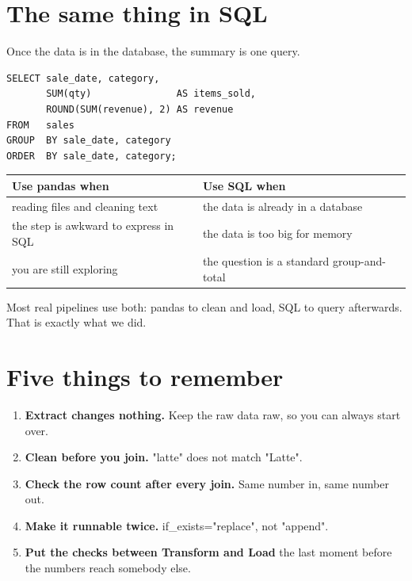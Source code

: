 \documentclass[11pt,letterpaper]{article}
\newcommand{\py}[1]{{\ttfamily\small#1}}
\begin{document}
\section{The same thing in SQL}

Once the data is in the database, the summary is one query.

\begin{lstlisting}[style=sql]
SELECT sale_date, category,
       SUM(qty)               AS items_sold,
       ROUND(SUM(revenue), 2) AS revenue
FROM   sales
GROUP  BY sale_date, category
ORDER  BY sale_date, category;
\end{lstlisting}

{\sffamily\footnotesize
\begin{tabular}{@{}p{6.4cm}p{6.4cm}@{}}
\toprule
\textbf{Use pandas when} & \textbf{Use SQL when} \\
\midrule
reading files and cleaning text       & the data is already in a database \\
the step is awkward to express in SQL & the data is too big for memory \\
you are still exploring               & the question is a standard group-and-total \\
\bottomrule
\end{tabular}}

\vspace{4pt}
Most real pipelines use both: pandas to clean and load, SQL to query afterwards. That is exactly what
we did.

\section{Five things to remember}

\begin{enumerate}
  \item \textbf{Extract changes nothing.} Keep the raw data raw, so you can always start over.
  \item \textbf{Clean before you join.} \py{"latte"} does not match \py{"Latte"}.
  \item \textbf{Check the row count after every join.} Same number in, same number out.
  \item \textbf{Make it runnable twice.} \py{if\_exists="replace"}, not \py{"append"}.
  \item \textbf{Put the checks between Transform and Load} \textemdash{} the last moment before the
        numbers reach somebody else.
\end{enumerate}
\end{document}

